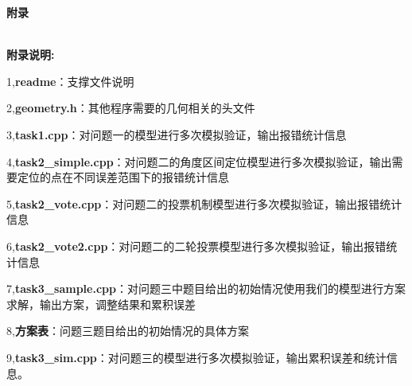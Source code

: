 \documentclass{ctexart}
\begin{document}
\newpage
\begin{flushleft}
    \Large{ \textbf{附录}}

    ~\\

    \normalsize \textbf{附录说明:}

    1,\textbf{readme}：支撑文件说明
    
    2,\textbf{geometry.h}：其他程序需要的几何相关的头文件

    3,\textbf{task1.cpp}：对问题一的模型进行多次模拟验证，输出报错统计信息 

    4,\textbf{task2\_simple.cpp}：对问题二的角度区间定位模型进行多次模拟验证，输出需要定位的点在不同误差范围下的报错统计信息

    5,\textbf{task2\_vote.cpp}：对问题二的投票机制模型进行多次模拟验证，输出报错统计信息

    6,\textbf{task2\_vote2.cpp}：对问题二的二轮投票模型进行多次模拟验证，输出报错统计信息

    7,\textbf{task3\_sample.cpp}：对问题三中题目给出的初始情况使用我们的模型进行方案求解，输出方案，调整结果和累积误差

    8,\textbf{方案表}：问题三题目给出的初始情况的具体方案

    9,\textbf{task3\_sim.cpp}：对问题三的模型进行多次模拟验证，输出累积误差和统计信息。


    
  

\end{flushleft}
\end{document}
